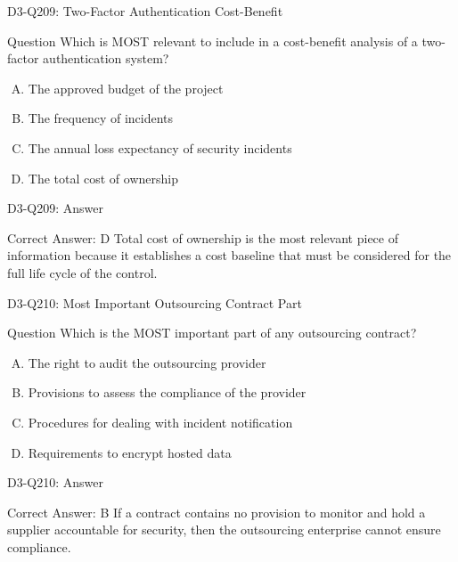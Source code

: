\documentclass{beamer}
\begin{document}
	\begin{frame}{D3-Q209: Two-Factor Authentication Cost-Benefit}
		\begin{block}{Question}
			Which is MOST relevant to include in a cost-benefit analysis of a two-factor authentication system?
		\end{block}
		\begin{enumerate}[(A)]
			\item The approved budget of the project
			\item The frequency of incidents
			\item The annual loss expectancy of security incidents
			\item The total cost of ownership
		\end{enumerate}
	\end{frame}
	\begin{frame}{D3-Q209: Answer}
		\begin{block}{Correct Answer: D}
			Total cost of ownership is the most relevant piece of information because it establishes a cost baseline that must be considered for the full life cycle of the control.
		\end{block}
	\end{frame}
	
	\begin{frame}{D3-Q210: Most Important Outsourcing Contract Part}
		\begin{block}{Question}
			Which is the MOST important part of any outsourcing contract?
		\end{block}
		\begin{enumerate}[(A)]
			\item The right to audit the outsourcing provider
			\item Provisions to assess the compliance of the provider
			\item Procedures for dealing with incident notification
			\item Requirements to encrypt hosted data
		\end{enumerate}
	\end{frame}
	\begin{frame}{D3-Q210: Answer}
		\begin{block}{Correct Answer: B}
			If a contract contains no provision to monitor and hold a supplier accountable for security, then the outsourcing enterprise cannot ensure compliance.
		\end{block}
	\end{frame}
	
\end{document}
